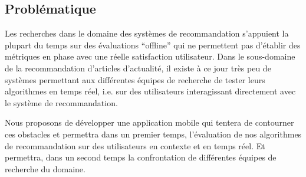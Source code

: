 \subsection{Problématique}

Les recherches dans le domaine des systèmes de recommandation s’appuient la plupart du temps sur des évaluations “offline” qui ne permettent pas d’établir des métriques en phase avec une réelle satisfaction utilisateur. Dans le sous-domaine de la recommandation d’articles d’actualité, il existe à ce jour très peu de systèmes permettant aux différentes équipes de recherche de tester leurs algorithmes en temps réel, i.e. sur des utilisateurs interagissant directement avec le système de recommandation. 


Nous proposons de développer une application mobile qui tentera de contourner ces obstacles et  permettra dans un premier temps, l’évaluation de nos algorithmes de recommandation sur des utilisateurs en contexte et en temps réel. Et permettra, dans un second temps la confrontation de différentes équipes de recherche du domaine.




